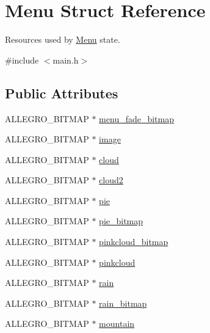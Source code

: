 \hypertarget{structMenu}{\section{\-Menu \-Struct \-Reference}
\label{structMenu}
}


\-Resources used by \hyperlink{structMenu}{\-Menu} state.  




{\ttfamily \#include $<$main.\-h$>$}

\subsection*{\-Public \-Attributes}
\begin{DoxyCompactItemize}
\item 
\-A\-L\-L\-E\-G\-R\-O\-\_\-\-B\-I\-T\-M\-A\-P $\ast$ \hyperlink{structMenu_a4d3a2c17b2882c7adf10a15ba49932b4}{menu\-\_\-fade\-\_\-bitmap}
\item 
\-A\-L\-L\-E\-G\-R\-O\-\_\-\-B\-I\-T\-M\-A\-P $\ast$ \hyperlink{structMenu_a7ac035a3356434a3ce6eae45f876eba9}{image}
\item 
\-A\-L\-L\-E\-G\-R\-O\-\_\-\-B\-I\-T\-M\-A\-P $\ast$ \hyperlink{structMenu_a9abb4b7b9f726884aa378e746857b6f2}{cloud}
\item 
\-A\-L\-L\-E\-G\-R\-O\-\_\-\-B\-I\-T\-M\-A\-P $\ast$ \hyperlink{structMenu_a6ee03b8791791ecca4f9a3b9fb1851c1}{cloud2}
\item 
\-A\-L\-L\-E\-G\-R\-O\-\_\-\-B\-I\-T\-M\-A\-P $\ast$ \hyperlink{structMenu_a397eb035f88ef8138c4ba29f3fc1d63c}{pie}
\item 
\-A\-L\-L\-E\-G\-R\-O\-\_\-\-B\-I\-T\-M\-A\-P $\ast$ \hyperlink{structMenu_ab46ce3041264bac0aabde3abd7549877}{pie\-\_\-bitmap}
\item 
\-A\-L\-L\-E\-G\-R\-O\-\_\-\-B\-I\-T\-M\-A\-P $\ast$ \hyperlink{structMenu_a970ef9c492ae797fc59d22fa6cfead71}{pinkcloud\-\_\-bitmap}
\item 
\-A\-L\-L\-E\-G\-R\-O\-\_\-\-B\-I\-T\-M\-A\-P $\ast$ \hyperlink{structMenu_aec110fca9c47ccf9aaf6e4e7589b86f2}{pinkcloud}
\item 
\-A\-L\-L\-E\-G\-R\-O\-\_\-\-B\-I\-T\-M\-A\-P $\ast$ \hyperlink{structMenu_a3ba357f6bd47ac51f9aa9b9c381bbe9f}{rain}
\item 
\-A\-L\-L\-E\-G\-R\-O\-\_\-\-B\-I\-T\-M\-A\-P $\ast$ \hyperlink{structMenu_a9207cdbfc8c670d9069c9a2c64c6ca95}{rain\-\_\-bitmap}
\item 
\-A\-L\-L\-E\-G\-R\-O\-\_\-\-B\-I\-T\-M\-A\-P $\ast$ \hyperlink{structMenu_a3a957c0b3a961e3c2be9001c15e82208}{mountain}

\end{DoxyCompactItemize}

